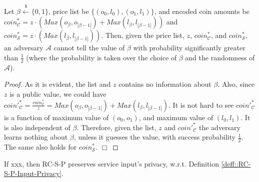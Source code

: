 \begin{lemma}\label{lemma::encoded-coins} Let $\beta\stackrel{\scriptscriptstyle\$}\leftarrow\{0,1\}$, price list be $\{(o_{\scriptscriptstyle 0},l_{\scriptscriptstyle 0}),(o_{\scriptscriptstyle 1},l_{\scriptscriptstyle 1})\}$, and encoded coin amounts be $coin^{\scriptscriptstyle *}_{\scriptscriptstyle\mathcal{C}}= z\cdot(Max(o_{\scriptscriptstyle\beta},o_{\scriptscriptstyle|\beta-1|})+Max(l_{\scriptscriptstyle\beta},l_{\scriptscriptstyle|\beta-1|}))$ and $coin^{\scriptscriptstyle *}_{\scriptscriptstyle\mathcal{S}}=z\cdot(Max(l_{\scriptscriptstyle\beta}, l_{\scriptscriptstyle |\beta-1|}))$. Then, given the price list, $z$, $coin^{\scriptscriptstyle *}_{\scriptscriptstyle\mathcal{C}}$, and $coin^{\scriptscriptstyle *}_{\scriptscriptstyle\mathcal{S}}$, an adversary $\mathcal{A}$ cannot tell the value of $\beta$ with probability significantly greater than $\frac{1}{2}$ (where the probability is taken over the choice of $\beta$ and the randomness of $\mathcal{A}$).
\end{lemma}



\begin{proof}
As it is evident, the list and $z$ contains no information about $\beta$. Also, since  $z$ is a public value, we could have   $coin'^{\scriptscriptstyle *}_{\scriptscriptstyle\mathcal C}=\frac{coin^{\scriptscriptstyle *}_{\scriptscriptstyle\mathcal C}}{z} = Max(o_{\scriptscriptstyle\beta},o_{\scriptscriptstyle|\beta-1|})+Max(l_{\scriptscriptstyle\beta}, l_{\scriptscriptstyle|\beta-1|})$. It is not hard to see $coin'^{\scriptscriptstyle *}_{\scriptscriptstyle\mathcal C}$ is a function of maximum value of $(o_{\scriptscriptstyle 0},o_{\scriptscriptstyle 1})$, and maximum value of $(l_{\scriptscriptstyle 0},l_{\scriptscriptstyle 1})$. It is also  independent of $\beta$. Therefore, given the list, $z$ and $coin'^{\scriptscriptstyle *}_{\scriptscriptstyle\mathcal C}$ the adversary learns nothing about $\beta$, unless it guesses the value,  with  success probability $\frac{1}{2}$. The same also holds for $coin^{\scriptscriptstyle *}_{\scriptscriptstyle\mathcal S}$. 
 \hfill\(\Box\)\end{proof}


\begin{lemma} If xxx, then RC-S-P preserves service input's privacy, w.r.t. Definition \ref{deff::RC-S-P-Input-Privacy}. 
\end{lemma}

